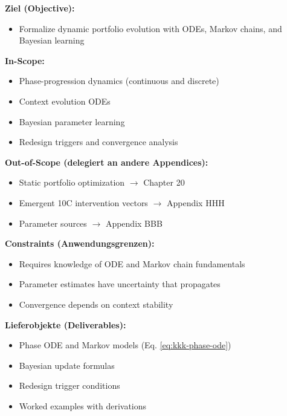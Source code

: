 \begin{tcolorbox}[
    colback=orange!5!white,
    colframe=orange!75!black,
    title={\textbf{Appendix Scope: Ziel / In-Scope / Out-of-Scope / Constraints}},
    fonttitle=\bfseries
]

\textbf{Ziel (Objective):}
\begin{itemize}[nosep]
    \item Formalize dynamic portfolio evolution with ODEs, Markov chains, and Bayesian learning
\end{itemize}

\textbf{In-Scope:}
\begin{itemize}[nosep]
    \item Phase-progression dynamics (continuous and discrete)
    \item Context evolution ODEs
    \item Bayesian parameter learning
    \item Redesign triggers and convergence analysis
\end{itemize}

\textbf{Out-of-Scope (delegiert an andere Appendices):}
\begin{itemize}[nosep]
    \item Static portfolio optimization $\rightarrow$ Chapter 20
    \item Emergent 10C intervention vectors $\rightarrow$ Appendix HHH
    \item Parameter sources $\rightarrow$ Appendix BBB
\end{itemize}

\textbf{Constraints (Anwendungsgrenzen):}
\begin{itemize}[nosep]
    \item Requires knowledge of ODE and Markov chain fundamentals
    \item Parameter estimates have uncertainty that propagates
    \item Convergence depends on context stability
\end{itemize}

\textbf{Lieferobjekte (Deliverables):}
\begin{itemize}[nosep]
    \item Phase ODE and Markov models (Eq. \ref{eq:kkk-phase-ode})
    \item Bayesian update formulas
    \item Redesign trigger conditions
    \item Worked examples with derivations
\end{itemize}

\end{tcolorbox}

